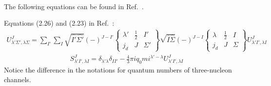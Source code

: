 \documentclass[11pt,aps]{revtex4}
\begin{document}
The following equations can be found in Ref.~\cite{Huber:1995zza}.

Equations (2.26) and (2.23) in Ref.~\cite{Huber:1995zza}:
\begin{equation}
\begin{split}
U^J_{\lambda'\Sigma',\lambda\Sigma}=\sum_{I'}\sum_{I}\sqrt{\hat{I'}\hat{\Sigma'}}(-)^{J-I'}
  \begin{Bmatrix}
    \lambda' & \frac 1 2  & I'\\
    j_d & J & \Sigma'
  \end{Bmatrix}
\sqrt{\hat{I}\hat{\Sigma}}(-)^{J-I}
  \begin{Bmatrix}
    \lambda & \frac 1 2  & I\\
    j_d & J & \Sigma
  \end{Bmatrix}
U^J_{\lambda'I',\lambda I}
\end{split}
\end{equation}
\begin{equation}
\begin{split}
S^J_{\lambda' I',\lambda I}=\delta_{\lambda'\lambda}\delta_{II'}-\frac 4 3 \pi iq_0 mi^{\lambda'-\lambda}U^J_{\lambda' I',\lambda I}
\end{split}
\end{equation}
Notice the difference in the notations for quantum numbers of three-nucleon channels.
\end{document}

